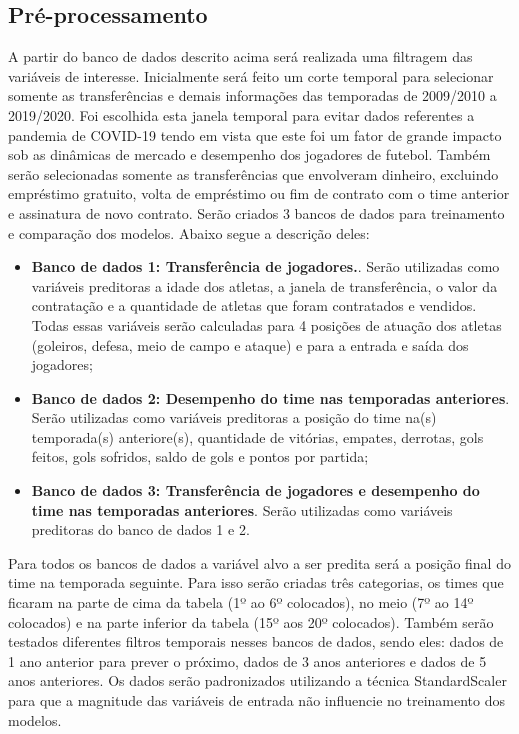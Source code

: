 \documentclass[a4paper]{article}
\theoremstyle{plain}
\theoremstyle{definition}
\begin{document}
\subsection{Pré-processamento}
A partir do banco de dados descrito acima será realizada uma filtragem das variáveis de interesse. Inicialmente será feito um corte temporal para selecionar somente as transferências e demais informações das temporadas de 2009/2010 a 2019/2020. Foi escolhida esta janela temporal para evitar dados referentes a pandemia de COVID-19 tendo em vista que este foi um fator de grande impacto sob as dinâmicas de mercado e desempenho dos jogadores de futebol. Também serão selecionadas somente as transferências que envolveram dinheiro, excluindo empréstimo gratuito, volta de empréstimo ou fim de contrato com o time anterior e assinatura de novo contrato.
Serão criados 3 bancos de dados para treinamento e comparação dos modelos. Abaixo segue a descrição deles:
\begin{itemize}
    \item \textbf{Banco de dados 1: Transferência de jogadores.}. Serão utilizadas como variáveis preditoras a idade dos atletas, a janela de transferência, o valor da contratação e a quantidade de atletas que foram contratados e vendidos. Todas essas variáveis serão calculadas para 4 posições de atuação dos atletas (goleiros, defesa, meio de campo e ataque) e para a entrada e saída dos jogadores;
    \item \textbf{Banco de dados 2: Desempenho do time nas temporadas anteriores}. Serão utilizadas como variáveis preditoras a posição do time na(s) temporada(s) anteriore(s), quantidade de vitórias, empates, derrotas, gols feitos, gols sofridos, saldo de gols e pontos por partida;
    \item \textbf{Banco de dados 3: Transferência de jogadores e desempenho do time nas temporadas anteriores}. Serão utilizadas como variáveis preditoras do banco de dados 1 e 2.
\end{itemize}

Para todos os bancos de dados a variável alvo a ser predita será a posição final do time na temporada seguinte. Para isso serão criadas três categorias, os times que ficaram na parte de cima da tabela (1º ao 6º colocados), no meio (7º ao 14º colocados) e na parte inferior da tabela (15º aos 20º colocados). Também serão testados diferentes filtros temporais nesses bancos de dados, sendo eles: dados de 1 ano anterior para prever o próximo, dados de 3 anos anteriores e dados de 5 anos anteriores. Os dados serão padronizados utilizando a técnica StandardScaler para que a magnitude das variáveis de entrada não influencie no treinamento dos modelos. 
\end{document}
